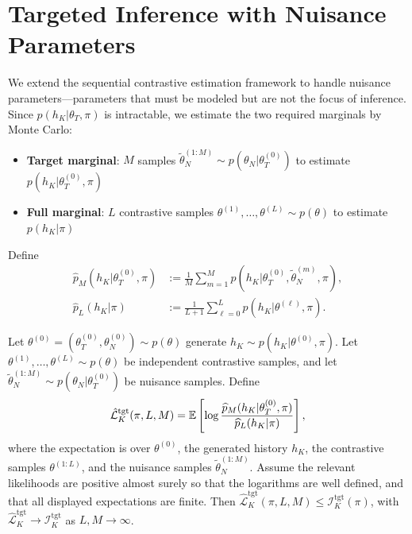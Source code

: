 
\section{Targeted Inference with Nuisance Parameters}
\label{sec:nuisance}

We extend the sequential contrastive estimation framework to handle nuisance parameters—parameters that must be modeled but are not the focus of inference.
Since $p(h_K|\theta_T,\pi)$ is intractable, we estimate the two required marginals by Monte Carlo:
\begin{itemize}
    \item \textbf{Target marginal}: $M$ samples $\tilde{\theta}_N^{(1:M)} \sim p(\theta_N|\theta_T^{(0)})$ to estimate $p(h_K|\theta_T^{(0)},\pi)$
    \item \textbf{Full marginal}: $L$ contrastive samples $\theta^{(1)},\ldots,\theta^{(L)} \sim p(\theta)$ to estimate $p(h_K|\pi)$
\end{itemize}
Define
\begin{align}
\widehat p_M(h_K|\theta_T^{(0)},\pi)
&:= \frac{1}{M}\sum_{m=1}^{M} p(h_K|\theta_T^{(0)}, \tilde{\theta}_N^{(m)}, \pi), \\
\widehat p_L(h_K|\pi)
&:= \frac{1}{L+1}\sum_{\ell=0}^{L} p(h_K|\theta^{(\ell)}, \pi).
\end{align}

\begin{theorem}
\label{thm:targeted_spce}
Let $\theta^{(0)} = (\theta_T^{(0)}, \theta_N^{(0)}) \sim p(\theta)$ generate $h_K \sim p(h_K|\theta^{(0)}, \pi)$. Let $\theta^{(1)},\ldots,\theta^{(L)} \sim p(\theta)$ be independent contrastive samples, and let $\tilde{\theta}_N^{(1:M)} \sim p(\theta_N|\theta_T^{(0)})$ be nuisance samples. Define
\begin{equation}
\hat{\mathcal{L}}_K^{\text{tgt}}(\pi, L, M) = \operatorname{\mathbb{E}}\left[\log \frac{\widehat p_M(h_K|\theta_T^{(0)},\pi)}{\widehat p_L(h_K|\pi)}\right],
\end{equation}
where the expectation is over $\theta^{(0)}$, the generated history $h_K$, the contrastive samples $\theta^{(1:L)}$, and the nuisance samples $\tilde{\theta}_N^{(1:M)}$.
Assume the relevant likelihoods are positive almost surely so that the logarithms are well defined, and that all displayed expectations are finite.
Then $\hat{\mathcal{L}}_K^{\text{tgt}}(\pi, L, M) \leq \mathcal{I}_K^{\text{tgt}}(\pi)$, with $\hat{\mathcal{L}}_K^{\text{tgt}} \to \mathcal{I}_K^{\text{tgt}}$ as $L, M \to \infty$.
\end{theorem}

